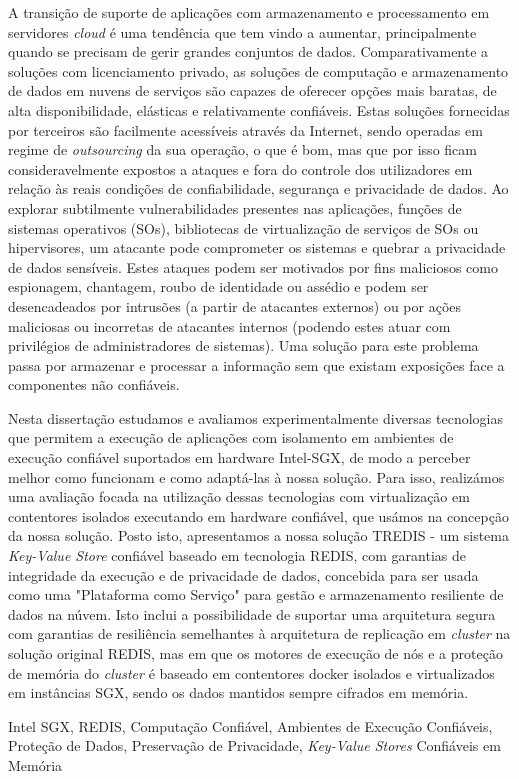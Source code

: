A transição de suporte de aplicações com armazenamento e processamento em servidores \textit{cloud} é uma tendência que tem vindo a aumentar, principalmente quando se precisam de gerir grandes conjuntos de dados. Comparativamente a soluções com licenciamento privado, as soluções de computação e armazenamento de dados em nuvens de serviços são capazes de oferecer opções mais baratas, de alta disponibilidade, elásticas e relativamente confiáveis. Estas soluções fornecidas por terceiros são facilmente acessíveis através da Internet, sendo operadas em regime de \textit{outsourcing} da sua operação, o que é bom, mas que por isso ficam consideravelmente expostos a ataques e fora do controle dos utilizadores em relação às reais condições de confiabilidade, segurança e privacidade de dados. Ao explorar subtilmente vulnerabilidades presentes nas aplicações, funções de sistemas operativos (SOs), bibliotecas de virtualização de serviços de SOs ou hipervisores, um atacante pode comprometer os sistemas e quebrar a privacidade de dados sensíveis. Estes ataques podem ser motivados por fins maliciosos como espionagem, chantagem, roubo de identidade ou assédio e podem ser desencadeados por intrusões (a partir de atacantes externos) ou por ações maliciosas ou incorretas de atacantes internos (podendo estes atuar com privilégios de administradores de sistemas). Uma solução para este problema passa por armazenar e processar a informação sem que existam exposições face a componentes não confiáveis. 

Nesta dissertação estudamos e avaliamos experimentalmente diversas tecnologias que permitem a execução de aplicações com isolamento em ambientes de execução confiável suportados em hardware Intel-SGX, de modo a perceber melhor como funcionam e como adaptá-las à nossa solução. Para isso, realizámos uma avaliação focada na utilização dessas tecnologias com virtualização em contentores isolados executando em hardware confiável, que usámos na concepção da nossa solução. Posto isto, apresentamos a nossa solução TREDIS - um sistema \textit{Key-Value Store} confiável baseado em tecnologia REDIS, com garantias de integridade da execução e de privacidade de dados, concebida para ser usada como uma "Plataforma como Serviço" para gestão e armazenamento resiliente de dados na núvem. Isto inclui a possibilidade de suportar uma arquitetura segura com garantias de resiliência semelhantes à arquitetura de replicação em \textit{cluster} na solução original REDIS, mas em que os motores de execução de nós e a proteção de memória do \textit{cluster} é baseado em contentores docker isolados e virtualizados em instâncias SGX, sendo os dados mantidos sempre cifrados em memória.
	
\begin{keywords}
 Intel SGX, REDIS, Computação Confiável, Ambientes de Execução Confiáveis, Proteção de Dados, Preservação de Privacidade, \textit{Key-Value Stores} Confiáveis em Memória
\end{keywords}


	
